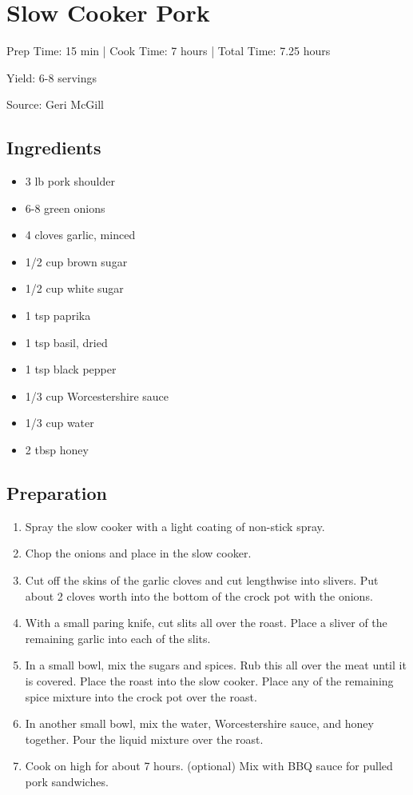 \section{Slow Cooker Pork}

\begin{center}
Prep Time: 15 min |
Cook Time: 7 hours |
Total Time: 7.25 hours

\noindent Yield: 6-8 servings

\vspace{1em}

Source: Geri McGill
\end{center}

\subsection{Ingredients}
\begin{multicols}{2}
\begin{itemize}
    \item 3 lb pork shoulder
    \item 6-8 green onions
    \item 4 cloves garlic, minced
    \item 1/2 cup brown sugar
    \item 1/2 cup white sugar
    \item 1 tsp paprika
    \item 1 tsp basil, dried
    \item 1 tsp black pepper
    \item 1/3 cup Worcestershire sauce
    \item 1/3 cup water
    \item 2 tbsp honey
\end{itemize}
\end{multicols}

\subsection{Preparation}
\begin{enumerate}
    \item Spray the slow cooker with a light coating of non-stick spray.
    \item Chop the onions and place in the slow cooker.
    \item Cut off the skins of the garlic cloves and cut lengthwise into slivers. Put about 2 cloves worth into the bottom of the crock pot with the onions.
    \item With a small paring knife, cut slits all over the roast. Place a sliver of the remaining garlic into each of the slits.
    \item In a small bowl, mix the sugars and spices. Rub this all over the meat until it is covered. Place the roast into the slow cooker. Place any of the remaining spice mixture into the crock pot over the roast.
    \item In another small bowl, mix the water, Worcestershire sauce, and honey together. Pour the liquid mixture over the roast.
    \item Cook on high for about 7 hours. (optional) Mix with BBQ sauce for pulled pork sandwiches.
\end{enumerate}
